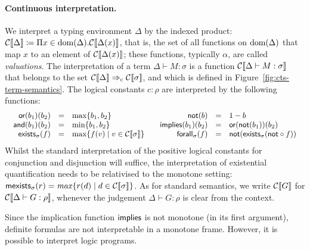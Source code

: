\paragraph{Continuous interpretation.}
We interpret a typing environment $\Delta$ by the indexed product:
$
  \mathcal{C}\llbracket \Delta \rrbracket \coloneqq \Pi x \in \mathrm{dom}(\Delta).\mathcal{C}\llbracket \Delta(x) \rrbracket
$,
that is, the set of all functions on $\mathrm{dom}(\Delta)$ that map $x$ to an element of $\mathcal{C}\llbracket \Delta(x) \rrbracket$;
these functions, typically $\alpha$, are called \emph{valuations}.
The interpretation of a term $\Delta \vdash M : \sigma$ is a function $\mathcal{C}\llbracket \Delta \vdash M : \sigma \rrbracket$ that belongs to the set $\mathcal{C}\llbracket \Delta \rrbracket \Rightarrow_{\rm c} \mathcal{C}\llbracket \sigma \rrbracket$, and which is defined in Figure~\ref{fig:cts-term-semantics}.
The logical constants $c : \rho$ are interpreted by the following functions:
\[
  \begin{array}{cc}
  \begin{array}{rcl}
    \mathsf{or}(b_1)(b_2) &=& \max \{b_1,b_2\} \\
    \mathsf{and}(b_1)(b_2) &=& \min \{b_1,b_2\} \\
    \mathsf{exists}_\sigma(f) &=& \max \{ f(v) \mid v \in \mathcal{C}\llbracket \sigma \rrbracket \}
  \end{array}
  &
  \begin{array}{rcl}
    \mathsf{not}(b) &=& 1 - b \\
    \mathsf{implies}(b_1)(b_2) &=& \mathsf{or}(\mathsf{not}(b_1))(b_2) \\
    \mathsf{forall}_\sigma(f) &=& \mathsf{not} (\mathsf{exists}_\sigma(\mathsf{not} \circ f))
  \end{array}
  \end{array}
\]
Whilst the standard interpretation of the positive logical constants for conjunction and disjunction will suffice, the interpretation of existential quantification needs to be relativised to the monotone setting:
$
  \mathsf{mexists}_\sigma(r) = \mathit{max} \{r(d) \mid d \in \mathcal{C}\llbracket \sigma \rrbracket\}
$.
As for standard semantics, we write $\mathcal{C}\llbracket G \rrbracket$ for $\mathcal{C}\llbracket \Delta \vdash  G : \rho \rrbracket$, whenever the judgement $\Delta \vdash  G : \rho$ is clear from the context.

Since the implication function $\mathsf{implies}$ is not monotone (in its first argument), definite formulas are not interpretable in a monotone frame.
However, it is possible to interpret logic programs.



